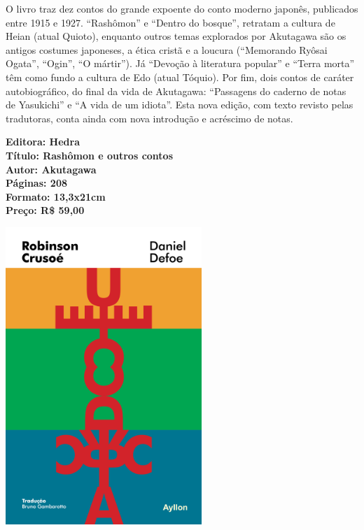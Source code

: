 \hspace*{-7cm}\hrulefill\hspace*{-7cm}

\medskip

\noindent{}O livro traz dez contos do grande expoente do conto moderno japonês, publicados entre 1915 e 1927. ``Rashômon'' e ``Dentro do bosque'', retratam a cultura de Heian (atual Quioto), enquanto outros temas explorados por Akutagawa são os antigos costumes japoneses, a ética cristã e a loucura (``Memorando Ryôsai Ogata'', ``Ogin'', ``O mártir''). Já ``Devoção à literatura popular'' e ``Terra morta'' têm como fundo a cultura de Edo (atual Tóquio). Por fim, dois contos de caráter autobiográfico, do final da vida de Akutagawa: ``Passagens do caderno de notas de Yasukichi'' e ``A vida de um idiota''. Esta nova edição, com texto revisto pelas tradutoras, conta ainda com nova introdução e acréscimo de notas.
\vfill

\noindent\begin{minipage}[c]{1\linewidth}
{\small\textbf{
\hspace*{-.1cm}Editora: Hedra\\
Título: Rashômon e outros contos\\
Autor: Akutagawa\\ 
Páginas: 208\\
Formato: 13,3x21cm\\
Preço: R\$ 59,00\\
}}
\end{minipage}

\pagebreak


\begin{center}
\hspace*{-3.6cm}
\hspace*{3.1cm}\includegraphics[width=74mm]{./grid/robinson.png}
\end{center}

